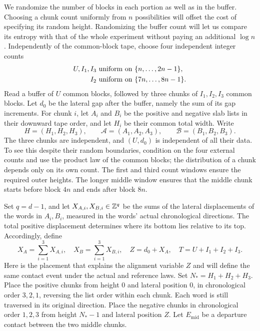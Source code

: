 We randomize the number of blocks in each portion as well as in the
buffer.  Choosing a chunk count uniformly from $n$ possibilities
will offset the cost of specifying its random height.  Randomizing
the buffer count will let us compare its entropy with that of the whole
experiment without paying an additional $\log n$.
Independently of the common-block tape, choose four independent
integer counts
\begin{equation}\label{eq:entropy-count-windows}
 \begin{split}
 U,I_1,I_3&\ \hbox{uniform on }\{n,\ldots,2n-1\},\\
 I_2&\ \hbox{uniform on }\{7n,\ldots,8n-1\}.
 \end{split}
\end{equation}
Read a buffer of $U$ common blocks, followed by three chunks of
$I_1,I_2,I_3$ common blocks.  Let $d_0$ be the lateral gap after the
buffer, namely the sum of its gap increments.  For chunk $i$, let
$A_i$ and $B_i$ be the positive and negative slab lists in their
downward tape order, and let $H_i$ be their common total width.  Write
\[
 H=(H_1,H_2,H_3),\qquad
 \mathcal A=(A_1,A_2,A_3),\qquad
 \mathcal B=(B_1,B_2,B_3).
\]
The three chunks are independent, and $(U,d_0)$ is independent of all
their data.  To see this despite their random boundaries, condition
on the four external counts and use the product law of the common
blocks; the distribution of a chunk depends only on its own count.
The first and third count windows ensure the required outer heights.
The longer middle window ensures that the middle chunk starts before
block $4n$ and ends after block $8n$.

Set $q=d-1$, and let $X_{A,i},X_{B,i}\in\mathbb Z^q$ be the sums of the
lateral displacements of the words in $A_i,B_i$, measured in the words' actual chronological
directions.  The total positive displacement determines where its
bottom lies relative to its top.  Accordingly, define
\begin{equation}\label{eq:entropy-alignment-variables}
 X_A=\sum_{i=1}^3X_{A,i},\quad X_B=\sum_{i=1}^3X_{B,i},\quad
 Z=d_0+X_A,\quad T=U+I_1+I_2+I_3.
\end{equation}
Here is the placement that explains the alignment variable $Z$ and
will define the same contact event under the actual and reference
laws.  Set $N_*=H_1+H_2+H_3$.  Place the positive chunks
from height $0$ and lateral position $0$, in chronological order
$3,2,1$, reversing the list order within each chunk.  Each word is
still traversed in its original direction.  Place the negative chunks
in chronological order $1,2,3$ from height $N_*-1$ and lateral position
$Z$.  Let $E_{\mathrm{mid}}$ be a departure contact between the two
middle chunks.

